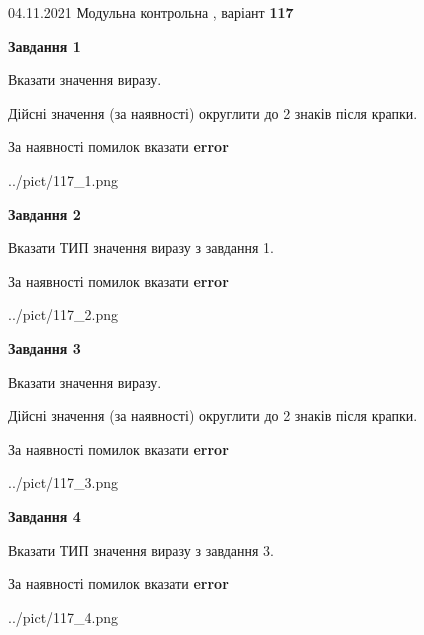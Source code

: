 \documentclass[11pt, ukrainian]{article}
\begin{document}
{04.11.2021 Модульна контрольна , варіант  \No \textbf { 117 }\par}
{
\begin {large}
{\begin {center}\textbf{Завдання 1}\end {center}}\par
Вказати значення виразу. \par
Дійсні значення (за наявності) округлити до 2 знаків після крапки. \par
За наявності помилок вказати \textbf{error}

\begin{center}
	{../pict/117_1.png}
\end{center}
\newpage

{\begin {center}\textbf{Завдання 2}\end {center}}\par
Вказати ТИП значення виразу з завдання 1. \par
За наявності помилок вказати \textbf{error}

\begin{center}
	{../pict/117_2.png}
\end{center}
\newpage

{\begin {center}\textbf{Завдання 3}\end {center}}\par
Вказати значення виразу. \par
Дійсні значення (за наявності) округлити до 2 знаків після крапки. \par
За наявності помилок вказати \textbf{error}

\begin{center}
	{../pict/117_3.png}
\end{center}
\newpage

{\begin {center}\textbf{Завдання 4}\end {center}}\par
Вказати ТИП значення виразу з завдання 3. \par
За наявності помилок вказати \textbf{error}

\begin{center}
	{../pict/117_4.png}
\end{center}
\newpage


\end{large}}
\end{document}

